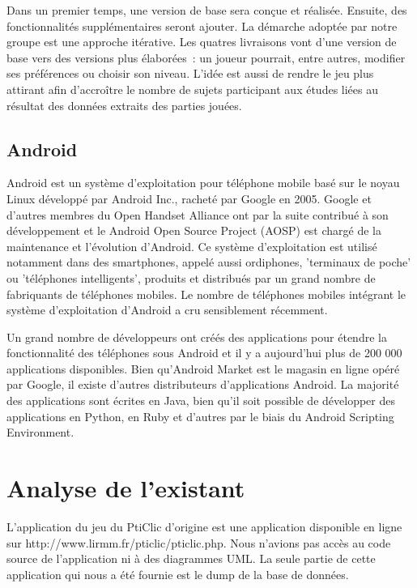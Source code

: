 \documentclass[a4paper,11pt,french]{article}
\begin{document}
Dans un premier temps, une version de base sera conçue et réalisée. Ensuite, des fonctionnalités supplémentaires seront ajouter. La démarche adoptée par notre groupe est une approche itérative. Les quatres livraisons vont d'une version de base vers des versions plus élaborées~: un joueur pourrait, entre autres, modifier ses préférences ou choisir son niveau. L'idée est aussi de rendre le jeu plus attirant afin d'accroître le nombre de sujets participant aux études liées au résultat des données extraits des parties jouées.


\subsection{Android}

Android est un système d'exploitation pour téléphone mobile basé sur le noyau Linux développé par Android Inc., racheté par Google en 2005. Google et d'autres membres du Open Handset Alliance ont par la suite contribué à son développement et le Android Open Source Project (AOSP) est chargé de la maintenance et l'évolution d'Android. Ce système d'exploitation est utilisé notamment dans des smartphones, appelé aussi ordiphones, 'terminaux de poche' ou 'téléphones intelligents', produits et distribués par un grand nombre de fabriquants de téléphones mobiles. Le nombre de téléphones mobiles intégrant le système d'exploitation d'Android a cru sensiblement récemment.

Un grand nombre de développeurs ont créés des applications pour étendre la fonctionnalité des téléphones sous Android et il y a aujourd'hui plus de 200 000 applications disponibles. Bien qu'Android Market est le magasin en ligne opéré par Google, il existe d'autres distributeurs d'applications Android. La majorité des applications sont écrites en Java, bien qu'il soit possible de développer des applications en Python, en Ruby et d'autres par le biais du Android Scripting Environment. 

 
\section{Analyse de l'existant}

L'application du jeu du PtiClic d'origine est une application disponible en ligne sur http://www.lirmm.fr/pticlic/pticlic.php. Nous n'avions pas accès au code source de l'application ni à des diagrammes UML. La seule partie de cette application qui nous a été fournie est le dump de la base de données. 
\end{document}
